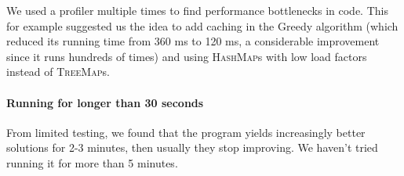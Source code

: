 \documentclass[11pt, a4paper, leqno]{article}
\begin{document}
	We used a profiler multiple times to find performance bottlenecks in code. This for example suggested us the idea to add caching in the Greedy algorithm (which reduced its running time from 360 ms to 120 ms, a considerable improvement since it runs hundreds of times) and using \textsc{HashMap}s with low load factors instead of \textsc{TreeMap}s.
	
	\paragraph{Running for longer than 30 seconds}
	
	From limited testing, we found that the program yields increasingly better solutions for 2-3 minutes, then usually they stop improving. We haven't tried running  it for more than 5 minutes.
	
\end{document}
